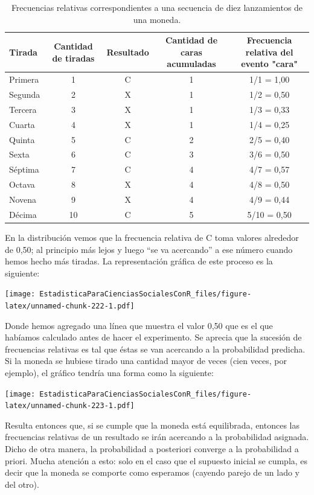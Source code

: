 \documentclass[]{book}
\begin{document}
\begin{table}

\caption{\label{tab:unnamed-chunk-221}Frecuencias relativas correspondientes a una secuencia de diez lanzamientos de una moneda.}
\centering
\begin{tabular}[t]{lcccc}
\toprule
Tirada & Cantidad de tiradas & Resultado & Cantidad de caras acumuladas & Frecuencia relativa del evento "cara"\\
\midrule
\rowcolor{gray!6}  Primera & 1 & C & 1 & 1/1 = 1,00\\
Segunda & 2 & X & 1 & 1/2 = 0,50\\
\rowcolor{gray!6}  Tercera & 3 & X & 1 & 1/3 = 0,33\\
Cuarta & 4 & X & 1 & 1/4 = 0,25\\
\rowcolor{gray!6}  Quinta & 5 & C & 2 & 2/5 = 0,40\\
\addlinespace
Sexta & 6 & C & 3 & 3/6 = 0,50\\
\rowcolor{gray!6}  Séptima & 7 & C & 4 & 4/7 = 0,57\\
Octava & 8 & X & 4 & 4/8 = 0,50\\
\rowcolor{gray!6}  Novena & 9 & X & 4 & 4/9 = 0,44\\
Décima & 10 & C & 5 & 5/10 = 0,50\\
\bottomrule
\end{tabular}
\end{table}

En la distribución vemos que la frecuencia relativa de C toma valores
alrededor de 0,50; al principio más lejos y luego ``se va acercando'' a
ese número cuando hemos hecho más tiradas. La representación gráfica de
este proceso es la siguiente:

\texttt{[image: EstadisticaParaCienciasSocialesConR\_files/figure-latex/unnamed-chunk-222-1.pdf]}

Donde hemos agregado una línea que muestra el valor 0,50 que es el que habíamos calculado antes de hacer el experimento. Se aprecia que la sucesión de frecuencias relativas es tal que éstas se van acercando a la
probabilidad predicha. Si la moneda se hubiese tirado una cantidad mayor de veces (cien veces, por ejemplo), el gráfico tendría una forma como la siguiente:

\texttt{[image: EstadisticaParaCienciasSocialesConR\_files/figure-latex/unnamed-chunk-223-1.pdf]}

Resulta entonces que, si se cumple que la moneda está equilibrada,
entonces las frecuencias relativas de un resultado se irán acercando a la probabilidad asignada. Dicho de otra manera, la probabilidad a
posteriori converge a la probabilidad a priori. Mucha atención a esto: solo en el caso que el supuesto inicial se cumpla, es decir que la moneda se comporte como esperamos (cayendo parejo de un lado y del
otro).
\end{document}
